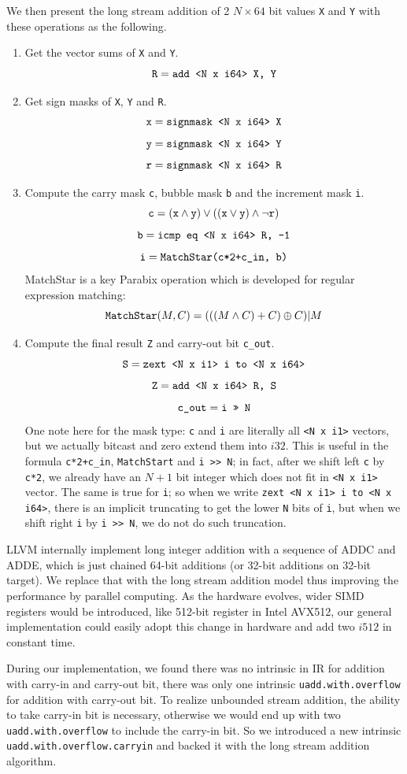 We then present the long stream addition of 2 $N \times 64$ bit values {\tt X} and {\tt Y} with these operations as the following.
\begin{enumerate}
    \item Get the vector sums of {\tt X} and {\tt Y}.
    \[\text{\tt R} = \text{\tt add <N x i64> X, Y} \]
    \item Get sign masks of {\tt X}, {\tt Y} and {\tt R}.
    \[\text{\tt x} = \text{\tt signmask <N x i64> X} \]
    \[\text{\tt y} = \text{\tt signmask <N x i64> Y} \]
    \[\text{\tt r} = \text{\tt signmask <N x i64> R} \]
    \item Compute the carry mask {\tt c}, bubble mask {\tt b} and the increment mask {\tt i}.
    \[\text{\tt c} = (\text{\tt x} \wedge \text{\tt y}) \vee ((\text{\tt x} \vee \text{\tt y}) \wedge \neg \text{\tt r})\]
    \[\text{\tt b} = \text{\tt icmp eq <N x i64> R, -1}\]
    \[\text{\tt i} = \text{\tt MatchStar(c*2+c\_in, b)}\]
    MatchStar is a key Parabix operation which is developed for regular expression matching:
    \[\text{\tt MatchStar}(M, C) = (((M \wedge C) + C)  \oplus C) | M\]
    \item Compute the final result {\tt Z} and carry-out bit {\tt c\_out}.
    \[\text{\tt S} = \text{\tt zext <N x i1> i to <N x i64>}\]
    \[\text{\tt Z} = \text{\tt add <N x i64> R, S}\]
    \[\text{\tt c\_out} = \text{\tt i >> N}\]
    One note here for the mask type: {\tt c} and {\tt i} are literally all \verb|<N x i1>| vectors, but we actually bitcast and zero extend them into $i32$. This is useful in the formula {\tt c*2+c\_in}, {\tt MatchStart} and {\tt i >> N}; in fact, after we shift left {\tt c} by {\tt c*2}, we already have an $N+1$ bit integer which does not fit in \verb|<N x i1>| vector. The same is true for {\tt i}; so when we write {\tt zext <N x i1> i to <N x i64>}, there is an implicit truncating to get the lower {\tt N} bits of {\tt i}, but when we shift right {\tt i} by {\tt i >> N}, we do not do such truncation.
\end{enumerate}

LLVM internally implement long integer addition with a sequence of ADDC and ADDE, which is just chained 64-bit additions (or 32-bit additions on 32-bit target). We replace that with the long stream addition model thus improving the performance by parallel computing. As the hardware evolves, wider SIMD registers would be introduced, like 512-bit register in Intel AVX512, our general implementation could easily adopt this change in hardware and add two $i512$ in constant time.

During our implementation, we found there was no intrinsic in IR for addition with carry-in and carry-out bit, there was only one intrinsic {\tt uadd.with.overflow} for addition with carry-out bit. To realize unbounded stream addition, the ability to take carry-in bit is necessary, otherwise we would end up with two {\tt uadd.with.overflow} to include the carry-in bit. So we introduced a new intrinsic {\tt uadd.with.overflow.carryin} and backed it with the long stream addition algorithm.
